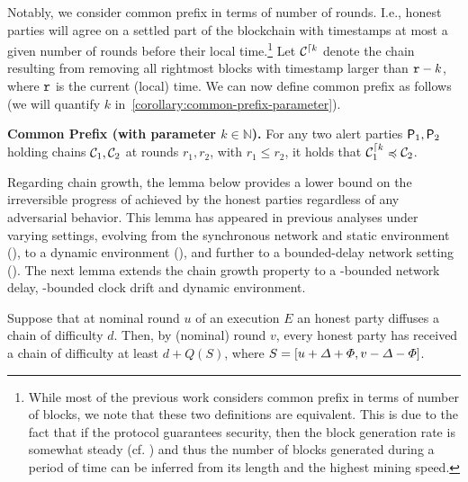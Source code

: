Notably, we consider common prefix in terms of number of rounds.
%
I.e., honest parties will agree on a settled part of the blockchain with timestamps at most a given number of rounds before their local time.\footnote{While most of the previous work considers common prefix in terms of number of blocks, we note that these two definitions are equivalent. This is due to the fact that if the protocol guarantees security, then the block generation rate is somewhat steady (cf. \cite{C:GarKiaLeo17}) and thus the number of blocks generated during a period of time can be inferred from its length and the highest mining speed.}
%
Let $\mathcal{C}^{\lceil k}$ denote the chain resulting from removing all rightmost blocks with timestamp larger than $\mathtt{r} - k$, where $\mathtt{r}$ is the current (local) time.
%
We can now define common prefix as follows (we will quantify $k$ in~\cref{corollary:common-prefix-parameter}).
%
\begin{cccItemize}[noitemsep]
    \item \textbf{Common Prefix (with parameter $k \in \mathbb{N}$).} For any two alert parties $\mathsf{P}_1, \mathsf{P}_2$ holding chains $\mathcal{C}_1, \mathcal{C}_2$ at rounds $r_1, r_2$, with $r_1 \le r_2$, it holds that $\mathcal{C}_1^{\lceil k} \preccurlyeq \mathcal{C}_2$.
\end{cccItemize}

Regarding chain growth, the lemma below provides a lower bound on the irreversible progress of achieved by the honest parties regardless of any adversarial behavior.
%
This lemma has appeared in previous analyses under varying settings, evolving from the synchronous network and static environment (\cite{EC:GarKiaLeo15}), to a dynamic environment (\cite{C:GarKiaLeo17}), and further to a bounded-delay network setting (\cite{EPRINT:GarKiaLeo20}).
%
The next lemma extends the chain growth property to a \delay-bounded network delay, \maxskew-bounded clock drift and dynamic environment.

\begin{lemma}
    \label{lemma:chain-growth}

    Suppose that at nominal round $u$ of an execution $E$ an honest party diffuses a chain of difficulty $d$.
    Then, by (nominal) round $v$, every honest party has received a chain of difficulty at least $d + Q(S)$, where $S = [u + \varDelta + \varPhi, v - \varDelta - \varPhi]$.
\end{lemma}
